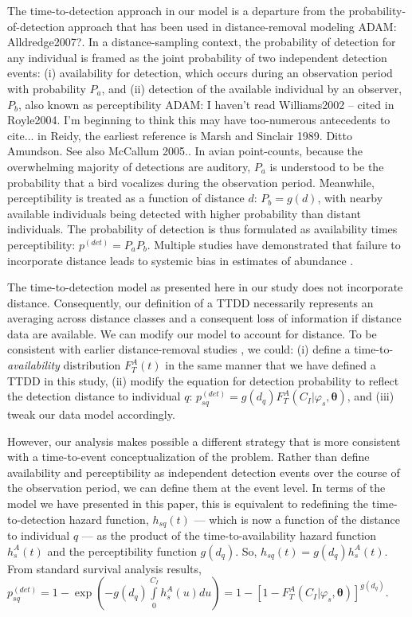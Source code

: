 \documentclass[useAMS,usenatbib,referee,12pt]{article}
\newcommand{\adam}[1]{{\color{blue} ADAM: #1}}
\newcommand{\pdet}{p^{(det)}}
\begin{document}
The time-to-detection approach in our model is a departure from the probability-of-detection approach that has been used in distance-removal modeling \citep{Farnsworth2005, Diefenbach2007, Solymos2013, Amundson2014}\adam{Alldredge2007?}.  
In a distance-sampling context, the probability of detection for any individual is framed as the joint probability of two independent detection events: (i) availability for detection, which occurs during an observation period with probability $P_a$, and (ii) detection of the available individual by an observer, $P_b$, also known as perceptibility \citep{Williams2002, Kery2008, Nichols2009}\adam{I haven't read Williams2002 -- cited in Royle2004.  
I'm  beginning to think this may have too-numerous antecedents to cite... in Reidy, the earliest reference is Marsh and Sinclair 1989.  
Ditto Amundson.
See also McCallum 2005.}.  
In avian point-counts, because the overwhelming majority of detections are auditory, $P_a$ is understood to be the probability that a bird vocalizes during the observation period.  
Meanwhile, perceptibility is treated as a function of distance $d$: $P_b = g(d)$, with nearby available individuals being detected with higher probability than distant individuals.  
The probability of detection is thus formulated as availability times perceptibility: $\pdet = P_aP_b$.  
Multiple studies have demonstrated that failure to incorporate distance leads to systemic bias in estimates of abundance \citep{EffordDawson2009, Solymos2013}.

The time-to-detection model as presented here in our study does not incorporate distance.  
Consequently, our definition of a TTDD necessarily represents an averaging across distance classes and a consequent loss of information if distance data are available.  
We can modify our model to account for distance.  
To be consistent with earlier distance-removal studies \citep{Farnsworth2005, Amundson2014}, we could: (i) define a time-to-\textit{availability} distribution $F_T^A(t)$ in the same manner that we have defined a TTDD in this study, (ii) modify the equation for detection probability to reflect the detection distance to individual $q$: $p_{sq}^{(det)} = g(d_q) F_T^A(C_I|\varphi_s, \boldsymbol{\theta})$, and (iii) tweak our data model accordingly.

However, our analysis makes possible a different strategy that is more consistent with a time-to-event conceptualization of the problem.  
Rather than define availability and perceptibility as independent detection events over the course of the observation period, we can define them at the event level.  
In terms of the model we have presented in this paper, this is equivalent to redefining the time-to-detection hazard function, $h_{sq}(t)$ --- which is now a function of the distance to individual $q$ --- as the product of the time-to-availability hazard function $h_{s}^A(t)$ and the perceptibility function $g(d_q)$.  
So, $h_{sq}(t) = g(d_q) h_{s}^A(t)$.  
From standard survival analysis results, $p_{sq}^{(det)} = 1 - \exp\left(-g(d_q)\int\limits_0^{C_I} h_{s}^A(u)du\right) = 1 - \left[1 - F_T^A(C_I|\varphi_s, \boldsymbol{\theta}) \right]^{g(d_q)}$.
\end{document}
